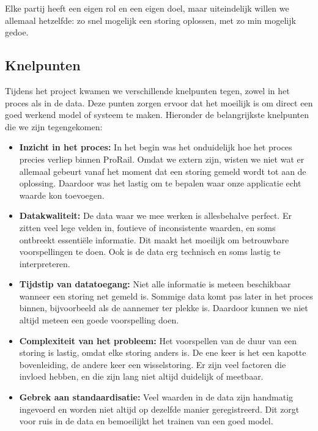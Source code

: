 \documentclass{article}
\begin{document}
Elke partij heeft een eigen rol en een eigen doel, maar uiteindelijk willen we allemaal hetzelfde: zo snel mogelijk een storing oplossen, met zo min mogelijk gedoe.

\subsection{Knelpunten}
Tijdens het project kwamen we verschillende knelpunten tegen, zowel in het proces als in de data. Deze punten zorgen ervoor dat het moeilijk is om direct een goed werkend model of systeem te maken. Hieronder de belangrijkste knelpunten die we zijn tegengekomen:

\begin{itemize}
    \item \textbf{Inzicht in het proces:} In het begin was het onduidelijk hoe het proces precies verliep binnen ProRail. Omdat we extern zijn, wisten we niet wat er allemaal gebeurt vanaf het moment dat een storing gemeld wordt tot aan de oplossing. Daardoor was het lastig om te bepalen waar onze applicatie echt waarde kon toevoegen.

    \item \textbf{Datakwaliteit:} De data waar we mee werken is allesbehalve perfect. Er zitten veel lege velden in, foutieve of inconsistente waarden, en soms ontbreekt essentiële informatie. Dit maakt het moeilijk om betrouwbare voorspellingen te doen. Ook is de data erg technisch en soms lastig te interpreteren.

    \item \textbf{Tijdstip van datatoegang:} Niet alle informatie is meteen beschikbaar wanneer een storing net gemeld is. Sommige data komt pas later in het proces binnen, bijvoorbeeld als de aannemer ter plekke is. Daardoor kunnen we niet altijd meteen een goede voorspelling doen.

    \item \textbf{Complexiteit van het probleem:} Het voorspellen van de duur van een storing is lastig, omdat elke storing anders is. De ene keer is het een kapotte bovenleiding, de andere keer een wisselstoring. Er zijn veel factoren die invloed hebben, en die zijn lang niet altijd duidelijk of meetbaar.

    \item \textbf{Gebrek aan standaardisatie:} Veel waarden in de data zijn handmatig ingevoerd en worden niet altijd op dezelfde manier geregistreerd. Dit zorgt voor ruis in de data en bemoeilijkt het trainen van een goed model.
\end{itemize}
\end{document}
